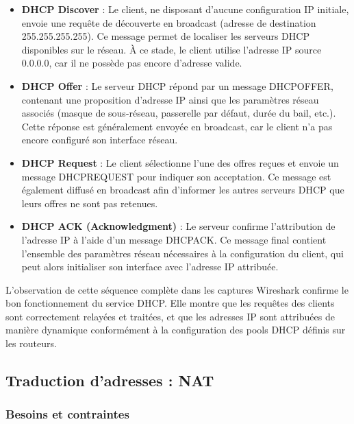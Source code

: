 \documentclass[12pt,a4paper, oneside]{memoir}
\begin{document}
	\begin{itemize}
		\item \textbf{DHCP Discover} : 
		Le client, ne disposant d’aucune configuration IP initiale, envoie une requête de découverte en broadcast (adresse de destination 255.255.255.255). 
		Ce message permet de localiser les serveurs DHCP disponibles sur le réseau. 
		À ce stade, le client utilise l’adresse IP source 0.0.0.0, car il ne possède pas encore d’adresse valide.
		
		\item \textbf{DHCP Offer} : 
		Le serveur DHCP répond par un message DHCPOFFER, contenant une proposition d’adresse IP ainsi que les paramètres réseau associés (masque de sous-réseau, passerelle par défaut, durée du bail, etc.). 
		Cette réponse est généralement envoyée en broadcast, car le client n’a pas encore configuré son interface réseau.
		
		\item \textbf{DHCP Request} : 
		Le client sélectionne l’une des offres reçues et envoie un message DHCPREQUEST pour indiquer son acceptation. 
		Ce message est également diffusé en broadcast afin d’informer les autres serveurs DHCP que leurs offres ne sont pas retenues.
		
		\item \textbf{DHCP ACK (Acknowledgment)} : 
		Le serveur confirme l’attribution de l’adresse IP à l’aide d’un message DHCPACK. 
		Ce message final contient l’ensemble des paramètres réseau nécessaires à la configuration du client, qui peut alors initialiser son interface avec l’adresse IP attribuée.
	\end{itemize}
	
	\medskip
	
	\noindent
	L’observation de cette séquence complète dans les captures Wireshark confirme le bon fonctionnement du service DHCP. Elle montre que les requêtes des clients sont correctement relayées et traitées, et que les adresses IP sont attribuées de manière dynamique conformément à la configuration des pools DHCP définis sur les routeurs.


\subsection{Traduction d’adresses : NAT}

\subsubsection{Besoins et contraintes}
\end{document}
